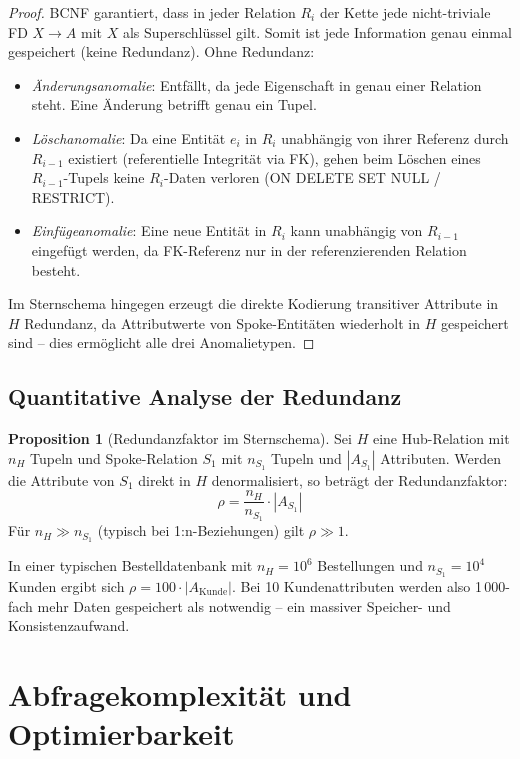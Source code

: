 ﻿\documentclass[12pt,a4paper]{article}
\theoremstyle{definition}
\newtheorem{proposition}[theorem]{Proposition}
\theoremstyle{remark}
\begin{document}
\begin{proof}
BCNF garantiert, dass in jeder Relation $R_i$ der Kette jede nicht-triviale
FD $X \to A$ mit $X$ als Superschlüssel gilt. Somit ist jede Information
genau einmal gespeichert (keine Redundanz). Ohne Redundanz:
\begin{itemize}
  \item \emph{Änderungsanomalie}: Entfällt, da jede Eigenschaft in genau einer
        Relation steht. Eine Änderung betrifft genau ein Tupel.
  \item \emph{Löschanomalie}: Da eine Entität $e_i$ in $R_i$ unabhängig von
        ihrer Referenz durch $R_{i-1}$ existiert (referentielle Integrität
        via FK), gehen beim Löschen eines $R_{i-1}$-Tupels keine $R_i$-Daten
        verloren (ON DELETE SET NULL / RESTRICT).
  \item \emph{Einfügeanomalie}: Eine neue Entität in $R_i$ kann unabhängig
        von $R_{i-1}$ eingefügt werden, da FK-Referenz nur in der
        referenzierenden Relation besteht.
\end{itemize}
Im Sternschema hingegen erzeugt die direkte Kodierung transitiver Attribute
in $H$ Redundanz, da Attributwerte von Spoke-Entitäten wiederholt in $H$
gespeichert sind -- dies ermöglicht alle drei Anomalietypen.
\end{proof}

\subsection{Quantitative Analyse der Redundanz}

\begin{proposition}[Redundanzfaktor im Sternschema]
\label{prop:redundanz}
Sei $H$ eine Hub-Relation mit $n_H$ Tupeln und Spoke-Relation $S_1$ mit
$n_{S_1}$ Tupeln und $|A_{S_1}|$ Attributen. Werden die Attribute von $S_1$
direkt in $H$ denormalisiert, so beträgt der Redundanzfaktor:
\[
  \rho = \frac{n_H}{n_{S_1}} \cdot |A_{S_1}|
\]
Für $n_H \gg n_{S_1}$ (typisch bei 1:n-Beziehungen) gilt $\rho \gg 1$.
\end{proposition}

In einer typischen Bestelldatenbank mit $n_H = 10^6$ Bestellungen und
$n_{S_1} = 10^4$ Kunden ergibt sich $\rho = 100 \cdot |A_{\text{Kunde}}|$.
Bei 10 Kundenattributen werden also 1\,000-fach mehr Daten gespeichert
als notwendig -- ein massiver Speicher- und Konsistenzaufwand.

\section{Abfragekomplexität und Optimierbarkeit}
\label{sec:abfragen}
\end{document}
